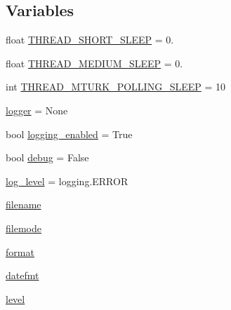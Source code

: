 \subsection*{Variables}
\begin{DoxyCompactItemize}
\item 
float \hyperlink{namespaceparlai_1_1mturk_1_1core_1_1legacy__2018_1_1shared__utils_a2f40ddbdc3a9904c448c322a279d6868}{T\+H\+R\+E\+A\+D\+\_\+\+S\+H\+O\+R\+T\+\_\+\+S\+L\+E\+EP} = 0.
\item 
float \hyperlink{namespaceparlai_1_1mturk_1_1core_1_1legacy__2018_1_1shared__utils_a0304a5284f1a819b65783d990b72b26d}{T\+H\+R\+E\+A\+D\+\_\+\+M\+E\+D\+I\+U\+M\+\_\+\+S\+L\+E\+EP} = 0.
\item 
int \hyperlink{namespaceparlai_1_1mturk_1_1core_1_1legacy__2018_1_1shared__utils_a1f83e0cd2b62e50a110ac4c62965f8ff}{T\+H\+R\+E\+A\+D\+\_\+\+M\+T\+U\+R\+K\+\_\+\+P\+O\+L\+L\+I\+N\+G\+\_\+\+S\+L\+E\+EP} = 10
\item 
\hyperlink{namespaceparlai_1_1mturk_1_1core_1_1legacy__2018_1_1shared__utils_ab410129c6feb22b35fffea7f72520490}{logger} = None
\item 
bool \hyperlink{namespaceparlai_1_1mturk_1_1core_1_1legacy__2018_1_1shared__utils_a7bbc4797b93322df8cc04e3cfb3b31f3}{logging\+\_\+enabled} = True
\item 
bool \hyperlink{namespaceparlai_1_1mturk_1_1core_1_1legacy__2018_1_1shared__utils_a370e2cb7632c42d9f69ff6692bc3b5d7}{debug} = False
\item 
\hyperlink{namespaceparlai_1_1mturk_1_1core_1_1legacy__2018_1_1shared__utils_af188495635ff2954d4865e00c91c5936}{log\+\_\+level} = logging.\+E\+R\+R\+OR
\item 
\hyperlink{namespaceparlai_1_1mturk_1_1core_1_1legacy__2018_1_1shared__utils_aed5dac024b40ed992a167cb7741a404f}{filename}
\item 
\hyperlink{namespaceparlai_1_1mturk_1_1core_1_1legacy__2018_1_1shared__utils_a7e7bdff7b031bd4bfad984a6a3379a47}{filemode}
\item 
\hyperlink{namespaceparlai_1_1mturk_1_1core_1_1legacy__2018_1_1shared__utils_a3152b906c00a47975900b176c92a0b7c}{format}
\item 
\hyperlink{namespaceparlai_1_1mturk_1_1core_1_1legacy__2018_1_1shared__utils_a370bb4f8079e87c4cc162415edf509d1}{datefmt}
\item 
\hyperlink{namespaceparlai_1_1mturk_1_1core_1_1legacy__2018_1_1shared__utils_a3b6291bdf5e07c3f8ec99c7f91c03dc5}{level}
\end{DoxyCompactItemize}


